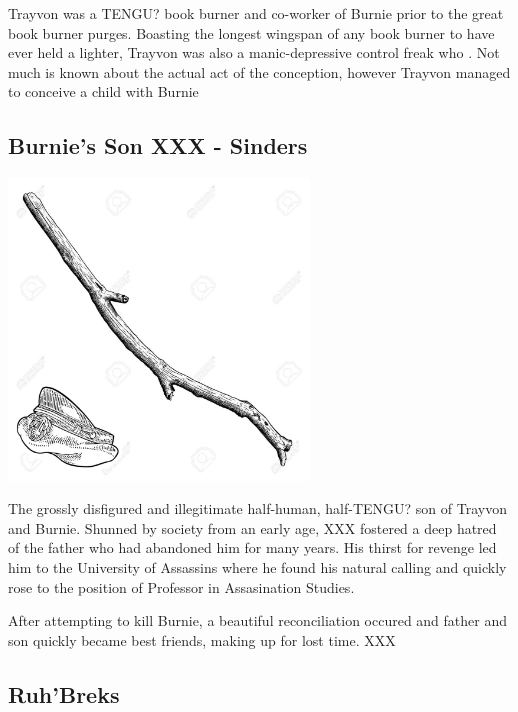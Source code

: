 \noindent 

Trayvon was a TENGU? book burner and co-worker of Burnie prior to the great book burner purges.  Boasting the longest wingspan of any book burner to have ever held a lighter, Trayvon was also a manic-depressive control freak who   .  Not much is known about the actual act of the conception, however Trayvon managed to conceive a child with Burnie  

\smallskip

\subsection*{Burnie's Son XXX - Sinders} 

\begin{center}
\includegraphics[width=80mm]{./content/img/xxx.png}
\begin{figure}[h]
\end{figure}
\end{center}

\noindent 

The grossly disfigured and illegitimate half-human, half-TENGU? son of Trayvon and Burnie.  Shunned by society from an early age, XXX fostered a deep hatred of the father who had abandoned him for many years.  His thirst for revenge led him to the University of Assassins where he found his natural calling and quickly rose to the position of Professor in Assasination Studies.  

After attempting to kill Burnie, a beautiful reconciliation occured and father and son quickly became best friends, making up for lost time.  XXX


\smallskip

\subsection*{Ruh'Breks} 

